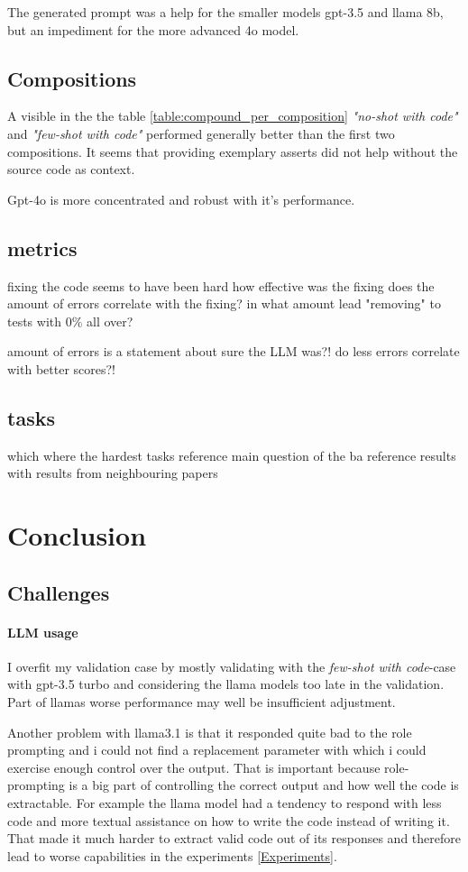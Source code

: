 \documentclass[a4paper,11pt,oneside]{memoir}
\begin{document}
The generated prompt was a help for the smaller models gpt-3.5 and llama 8b, but an impediment for the more advanced 4o model.

\section{Compositions}
A visible in the the table \ref{table:compound_per_composition} \textit{"no-shot with code"} and \textit{"few-shot with code"} performed generally better than the first two compositions. It seems that providing exemplary asserts did not help without the source code as context.

Gpt-4o is more concentrated and robust with it's performance.

\section{metrics}
fixing the code seems to have been hard
how effective was the fixing
    does the amount of errors correlate with the fixing?
    in what amount lead "removing" to tests with 0\% all over?

amount of errors is a statement about sure the LLM was?!
    do less errors correlate with better scores?!

\section{tasks}

which where the hardest tasks
reference main question of the ba
reference results with results from neighbouring papers

\chapter{Conclusion}

\section{Challenges}
\subsubsection{LLM usage}
I overfit my validation case by mostly validating with the \textit{few-shot with code}-case with gpt-3.5 turbo and considering the llama models too late in the validation. Part of llamas worse performance may well be insufficient adjustment.

Another problem with llama3.1 is that it responded quite bad to the role prompting and i could not find a replacement parameter with which i could exercise enough control over the output. That is important because role-prompting is a big part of controlling the correct output and how well the code is extractable. 
For example the llama model had a tendency to respond with less code and more textual assistance on how to write the code instead of writing it. That made it much harder to extract valid code out of its responses and therefore lead to worse capabilities in the experiments \ref{Experiments}.
\end{document}
